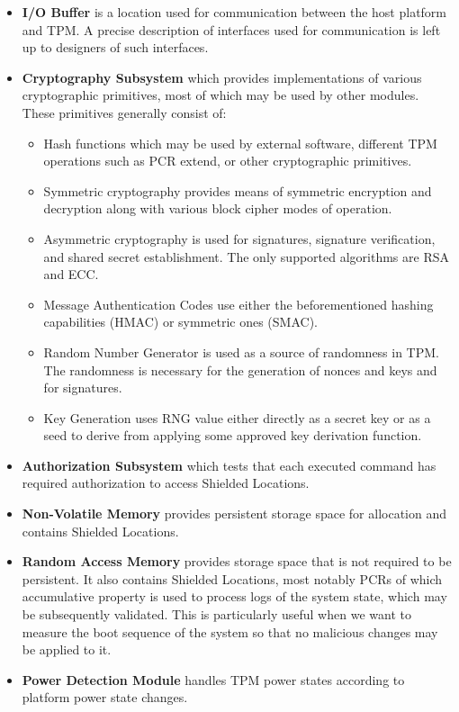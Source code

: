 \begin{itemize}

\item \textbf{I/O Buffer} is a location used for communication between the host platform and TPM. A precise description of interfaces used for communication is left up to designers of such interfaces.

\item \textbf{Cryptography Subsystem} which provides implementations of various cryptographic primitives, most of which may be used by other modules. These primitives generally consist of: 
\begin{itemize}
    \item Hash functions which may be used by external software, different TPM operations such as PCR extend, or other cryptographic primitives. 
    \item Symmetric cryptography provides means of symmetric encryption and decryption along with various block cipher modes of operation.
    \item Asymmetric cryptography is used for signatures, signature verification, and shared secret establishment. The only supported algorithms are RSA and ECC.
    \item Message Authentication Codes use either the beforementioned hashing capabilities (HMAC) or symmetric ones (SMAC).
    \item Random Number Generator is used as a source of randomness in TPM. The randomness is necessary for the generation of nonces and keys and for signatures. 
    \item Key Generation uses RNG value either directly as a secret key or as a seed to derive from applying some approved key derivation function.
\end{itemize}

\item \textbf{Authorization Subsystem} which tests that each executed command has required authorization to access Shielded Locations. 

\item \textbf{Non-Volatile Memory} provides persistent storage space for allocation and contains Shielded Locations.

\item \textbf{Random Access Memory} provides storage space that is not required to be persistent. It also contains Shielded Locations, most notably PCRs of which accumulative property is used to process logs of the system state, which may be subsequently validated. This is particularly useful when we want to measure the boot sequence of the system so that no malicious changes may be applied to it.

\item \textbf{Power Detection Module} handles TPM power states according to platform power state changes.
\end{itemize}

